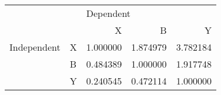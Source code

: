 \begin{tabular}{llrrr}
\toprule
            &   & \multicolumn{3}{l}{Dependent} \\
            &   &         X &         B &         Y \\
\midrule
Independent & X &  1.000000 &  1.874979 &  3.782184 \\
            & B &  0.484389 &  1.000000 &  1.917748 \\
            & Y &  0.240545 &  0.472114 &  1.000000 \\
\bottomrule
\end{tabular}
